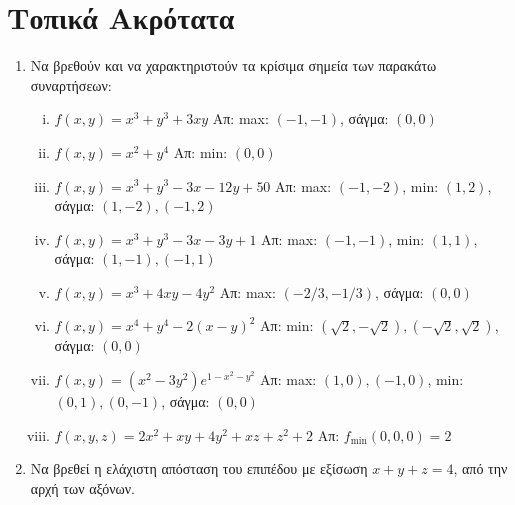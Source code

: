 \documentclass[a4paper,table]{report}
\begin{document}
\begin{center}
  \minibox{\large \bfseries \textcolor{Col1}{Ασκήσεις στα Ακρότατα}}
\end{center}

\vspace{\baselineskip}

\section*{Τοπικά Ακρότατα}

\begin{enumerate}
  \item Να βρεθούν και να χαρακτηριστούν τα κρίσιμα σημεία  των παρακάτω συναρτήσεων:
    \begin{enumerate}[i)]
      \item $ f(x,y) = x^{3} + y^{3} + 3xy $ 
        \hfill Απ: max: $(-1,-1)  $, σάγμα: $ (0,0) $
      \item $ f(x,y) = x^{2}+y^{4} $ 
        \hfill Απ: min: $ (0,0) $ 
      \item $ f(x,y) = x^{3} + y^{3} - 3x -12y + 50 $ 
        \hfill Απ: max: $ (-1,-2)$, min: $ (1,2) $, 
        σάγμα: $ (1,-2), (-1,2) $
      \item $ f(x,y) = x^{3} + y^{3} -3x -3y + 1 $ 
        \hfill Απ: max: $(-1,-1)  $, min: $ (1,1) $,
        σάγμα: $ (1,-1), (-1,1) $
      \item $ f(x,y) = x^{3} + 4xy -4y^{2} $ 
        \hfill Απ: max: $ (-2/3, -1/3)  $, σάγμα: $ (0,0) $
      \item $ f(x,y) = x^{4} + y^{4} -2(x-y)^{2}$  
        \hfill Απ: min: $ (\sqrt{2} , -\sqrt{2}), (-\sqrt{2} , \sqrt{2}) $, 
        σάγμα: $ (0,0) $
      \item $ f(x,y) = (x^{2}-3y^{2})e^{1-x^{2}-y^{2}} $ 
        \hfill Απ: max: $ (1,0), (-1,0) $, min: $ (0,1), (0,-1) $, 
        σάγμα: $ (0,0) $
      \item $ f(x,y,z) = 2x^{2} + xy + 4y^{2} + xz + z^{2} + 2  $ \hfill Απ: 
        $ f_{\text{min}}(0,0,0) = 2 $
    \end{enumerate}


  \item Να βρεθεί η ελάχιστη απόσταση του επιπέδου με εξίσωση $ x+y+z=4 $, από την 
    αρχή των αξόνων.


\end{enumerate}
\end{document}
